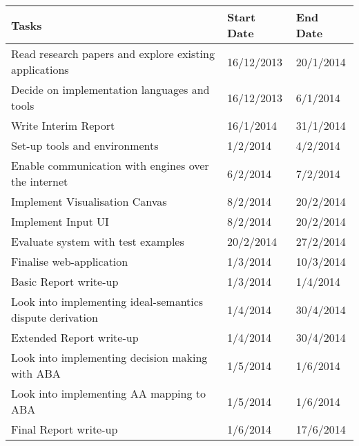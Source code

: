 \renewcommand{\arraystretch}{1.5}
\begin{center}
    \begin{tabular}{ | l | l | l |}
    \hline
    Tasks & Start Date & End Date \\ \hline
    Read research papers and explore existing applications & 16/12/2013 & 20/1/2014 \\ \hline
    Decide on implementation languages and tools & 16/12/2013 & 6/1/2014 \\ \hline
    Write Interim Report & 16/1/2014 & 31/1/2014 \\ \hline
    Set-up tools and environments & 1/2/2014 & 4/2/2014 \\ \hline
    Enable communication with engines over the internet & 6/2/2014 & 7/2/2014 \\ \hline
    Implement Visualisation Canvas & 8/2/2014 & 20/2/2014 \\ \hline
    Implement Input UI & 8/2/2014 & 20/2/2014 \\ \hline
    Evaluate system with test examples & 20/2/2014 & 27/2/2014 \\ \hline
    Finalise web-application & 1/3/2014 & 10/3/2014 \\ \rowcolor{lightgray} \hline 
    Basic Report write-up & 1/3/2014 & 1/4/2014 \\ \hline
    Look into implementing ideal-semantics dispute derivation & 1/4/2014 & 30/4/2014 \\ \rowcolor{lightgray} \hline 
    Extended Report write-up & 1/4/2014 & 30/4/2014 \\ \hline
    Look into implementing decision making with ABA & 1/5/2014 & 1/6/2014 \\ \rowcolor{lightgray} \hline
    Look into implementing AA mapping to ABA & 1/5/2014 & 1/6/2014 \\ \rowcolor{lightgray} \hline  
    Final Report write-up & 1/6/2014 & 17/6/2014 \\
    \hline
    \end{tabular}
\end{center}